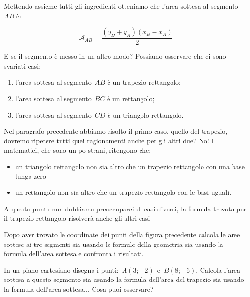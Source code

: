 Mettendo assieme tutti gli ingredienti otteniamo che l'area sottesa al 
segmento~$AB$ è:

\[\mathcal{A}_{AB} = \frac{(y_B + y_A) (x_B - x_A)}{2}\]

E se il segmento è messo in un altro modo?
Possiamo osservare che ci sono svariati casi:


\begin{center} \areasottesamolti \end{center}
\begin{enumerate} [nosep]
 \item l'area sottesa al segmento~$AB$ è un trapezio rettangolo;
 \item l'area sottesa al segmento~$BC$ è un rettangolo;
 \item l'area sottesa al segmento~$CD$ è un triangolo rettangolo.
\end{enumerate}

Nel paragrafo precedente abbiamo risolto il primo caso, quello del trapezio,
dovremo ripetere tutti quei ragionamenti anche per gli altri due? No! 
I matematici, che sono un po strani, ritengono che:

\begin{itemize} [noitemsep]
 \item 
  un triangolo rettangolo
  non sia altro che un trapezio rettangolo con una base lunga zero;
 \item 
  un rettangolo
  non sia altro che un trapezio rettangolo con le basi uguali.
\end{itemize}

A questo punto non dobbiamo preoccuparci di casi diversi, la formula trovata 
per il trapezio rettangolo risolverà anche gli altri casi

\begin{exrig}
 \begin{esempio}
\label{ex:D.18}
  Dopo aver trovato le coordinate dei punti della figura precedente calcola
  le aree sottese ai tre segmenti sia usando le formule della geometria
  sia usando la formula dell'area sottesa e confronta i risultati.
 \end{esempio}

 \begin{esempio}
  In un piano cartesiano disegna i punti:~$A(3; -2)$~e~$B(8; -6)$. 
  Calcola l'area sottesa a questo segmento sia usando la formula 
  dell'area del trapezio sia usando la formula dell'area sottesa...
  Cosa puoi osservare?
 \end{esempio}
\end{exrig}

